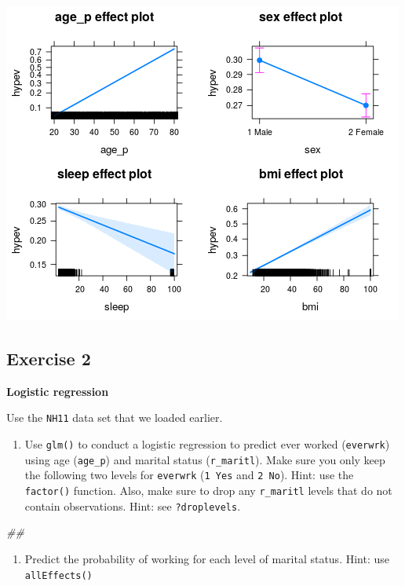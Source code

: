 \documentclass[
]{book}
\newenvironment{Shaded}{\begin{snugshade}}{\end{snugshade}}
\newcommand{\CommentTok}[1]{\textcolor[rgb]{0.56,0.35,0.01}{\textit{#1}}}
\providecommand{\tightlist}{%
  \setlength{\itemsep}{0pt}\setlength{\parskip}{0pt}}
\begin{document}
\includegraphics{R/Rmodels/images/effects1.png}

\hypertarget{exercise-2}{%
\subsection{Exercise 2}\label{exercise-2}}

\textbf{Logistic regression}

Use the \texttt{NH11} data set that we loaded earlier.

\begin{enumerate}
\def\labelenumi{\arabic{enumi}.}
\tightlist
\item
  Use \texttt{glm()} to conduct a logistic regression to predict ever worked (\texttt{everwrk}) using age (\texttt{age\_p}) and marital status (\texttt{r\_maritl}). Make sure you only keep the following two levels for \texttt{everwrk} (\texttt{1\ Yes} and \texttt{2\ No}). Hint: use the \texttt{factor()} function. Also, make sure to drop any \texttt{r\_maritl} levels that do not contain observations. Hint: see \texttt{?droplevels}.
\end{enumerate}

\begin{Shaded}
\begin{Highlighting}[]
\CommentTok{## }
\end{Highlighting}
\end{Shaded}

\begin{enumerate}
\def\labelenumi{\arabic{enumi}.}
\setcounter{enumi}{1}
\tightlist
\item
  Predict the probability of working for each level of marital status. Hint: use \texttt{allEffects()}
\end{enumerate}
\end{document}
